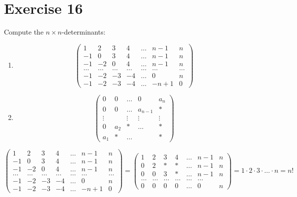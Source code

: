 \documentclass[a4paper]{article}
\theoremstyle{definition}
\begin{document}
\section{Exercise 16}
\begin{ex}
  Compute the $n\times n$-determinants:
  \begin{enumerate}
    \item \[
        \begin{pmatrix}
          1 & 2 & 3 & 4 & \ldots & n-1 & n \\
          -1 & 0 & 3 & 4 & \ldots & n-1 & n \\
          -1 & -2 & 0 & 4 & \ldots & n-1 & n \\
          \ldots & \ldots & \ldots & \ldots & \ldots & \ldots & \ldots \\
          -1 & -2 & -3 & -4 & \ldots & 0 & n \\
          -1 & -2 & -3 & -4 & \ldots & -n+1 & 0
        \end{pmatrix}
      \]
    \item \[
        \begin{pmatrix}
          0 & 0 & \ldots & 0 & a_n \\
          0 & 0 & \ldots & a_{n-1} & * \\
          \vdots & & \vdots & \vdots & \vdots \\
          0 & a_2 & * & \ldots & * \\
          a_1 & * & \ldots &  & *
        \end{pmatrix}
      \]
  \end{enumerate}
\end{ex}

\[
  \begin{pmatrix}
    1 & 2 & 3 & 4 & \ldots & n-1 & n \\
    -1 & 0 & 3 & 4 & \ldots & n-1 & n \\
    -1 & -2 & 0 & 4 & \ldots & n-1 & n \\
    \ldots & \ldots & \ldots & \ldots & \ldots & \ldots & \ldots \\
    -1 & -2 & -3 & -4 & \ldots & 0 & n \\
    -1 & -2 & -3 & -4 & \ldots & -n+1 & 0
  \end{pmatrix}
  =
  \begin{pmatrix}
    1 & 2 & 3 & 4 & \ldots & n-1 & n \\
    0 & 2 & * & * & \ldots & n-1 & n \\
    0 & 0 & 3 & * & \ldots & n-1 & n \\
    \ldots & \ldots & \ldots & \ldots & \ldots & \ldots \\
    0 & 0 & 0 & 0 & \ldots & 0 & n
  \end{pmatrix}
  = 1 \cdot 2 \cdot 3 \cdot \ldots \cdot n = n!
\]
\end{document}
